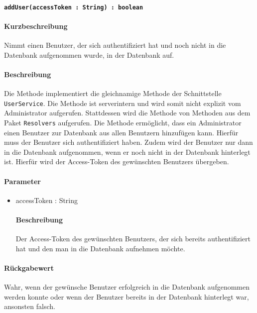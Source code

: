 \paragraph{\texttt{addUser(accessToken : String) : boolean}}%
\paragraph*{Kurzbeschreibung}
Nimmt einen Benutzer, der sich authentifiziert hat und noch nicht in die Datenbank aufgenommen wurde, in der Datenbank auf.
\paragraph*{Beschreibung}
Die Methode implementiert die gleichnamige Methode der Schnittstelle \texttt{UserService}.
Die Methode ist serverintern und wird somit nicht explizit vom Administrator aufgerufen.
Stattdessen wird die Methode von Methoden aus dem Paket \texttt{Resolvers} aufgerufen.
Die Methode ermöglicht, dass ein Administrator einen Benutzer zur Datenbank aus allen Benutzern hinzufügen kann. Hierfür muss der Benutzer sich authentifiziert haben. 
Zudem wird der Benutzer nur dann in die Datenbank aufgenommen, wenn er noch nicht in der Datenbank hinterlegt ist.
Hierfür wird der Access-Token des gewünschten Benutzers übergeben.
\paragraph*{Parameter}
\begin{itemize}
    \item accessToken : String
    		\paragraph*{Beschreibung}
    		Der Access-Token des gewünschten Benutzers, der sich bereits authentifiziert hat und den man in die Datenbank aufnehmen möchte.
\end{itemize}
\paragraph*{Rückgabewert}
Wahr, wenn der gewünsche Benutzer erfolgreich in die Datenbank aufgenommen werden konnte oder wenn der Benutzer bereits in der Datenbank hinterlegt war, ansonsten falsch.
